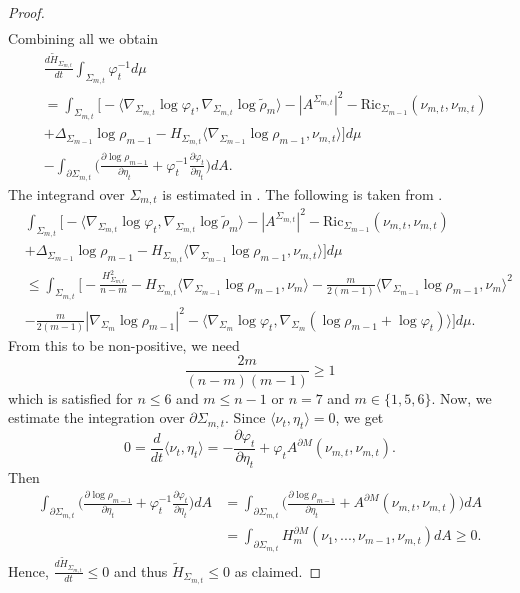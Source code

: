 \documentclass[11pt,letterpaper]{amsart}
\theoremstyle{definition}
\theoremstyle{remark}
\numberwithin{equation}{section}
\begin{document}
\begin{proof}
\[\begin{aligned}
\end{aligned}
\]
Combining all we obtain
\[
\begin{aligned}
    &\frac{d\tilde{H}_{\Sigma_{m,t}}}{dt}\int_{\Sigma_{m,t}}\varphi_{t}^{-1}d\mu\\
   &=\int_{\Sigma_{m,t}}\Big[-\langle \nabla_{\Sigma_{m,t}}\log\varphi_{t},\nabla_{\Sigma_{m,t}}\log\tilde{\rho}_{m}\rangle-|A^{\Sigma_{m,t}}|^2-\text{Ric}_{\Sigma_{m-1}}(\nu_{m,t},\nu_{m,t})
   \\
   &+\Delta_{\Sigma_{m-1}}\log\rho_{m-1}-H_{\Sigma_{m,t}}\langle \nabla_{\Sigma_{m-1}}\log\rho_{m-1},\nu_{m,t}\rangle\Big]d\mu\\
   &-\int_{\partial \Sigma_{m,t}}\Big(\frac{\partial \log\rho_{m-1}}{\partial \eta_{t}}+\varphi_{t}^{-1}\frac{\partial \varphi_{t}}{\partial \eta_{t}}\Big)dA.
\end{aligned}
\]
The integrand over $\Sigma_{m,t}$ is estimated in \cite{XuTrans}. The following is taken from \cite[page 2109 - page 2110]{XuTrans}.
\[
\begin{aligned}
    &\int_{\Sigma_{m,t}}\Big[-\langle \nabla_{\Sigma_{m,t}}\log\varphi_{t},\nabla_{\Sigma_{m,t}}\log\tilde{\rho}_{m}\rangle-|A^{\Sigma_{m,t}}|^2-\text{Ric}_{\Sigma_{m-1}}(\nu_{m,t},\nu_{m,t})
   \\
   &+\Delta_{\Sigma_{m-1}}\log\rho_{m-1}-H_{\Sigma_{m,t}}\langle \nabla_{\Sigma_{m-1}}\log\rho_{m-1},\nu_{m,t}\rangle\Big]d\mu\\
   &\leq \int_{\Sigma_{m,t}}\Big[-\frac{H_{\Sigma_{m,t}}^2}{n-m}-H_{\Sigma_{m,t}}\langle\nabla_{\Sigma_{m-1}}\log\rho_{m-1},\nu_{m}\rangle-\frac{m}{2(m-1)}\langle\nabla_{\Sigma_{m-1}}\log\rho_{m-1},\nu_{m}\rangle^2\\
   &-\frac{m}{2(m-1)}|\nabla_{\Sigma_{m}}\log\rho_{m-1}|^2-\langle\nabla_{\Sigma_{m}}\log\varphi_{t},\nabla_{\Sigma_{m}}(\log\rho_{m-1}+\log\varphi_{t})\rangle\Big]d\mu.
\end{aligned}
\]
From this to be non-positive, we need
\[
\frac{2m}{(n-m)(m-1)}\geq1
\]
which is satisfied for $n\leq 6$ and $m\leq n-1$ or $n=7$ and $m\in \{1,5,6\}$.
Now, we estimate the integration over $\partial \Sigma_{m,t}$. Since $\langle\nu_{t},\eta_{t}\rangle=0$, we get
\[
0=\frac{d}{dt}\langle\nu_{t},\eta_{t}\rangle=-\frac{\partial\varphi_{t}}{\partial \eta_{t}}+\varphi_{t}A^{\partial M}(\nu_{m,t},\nu_{m,t}).
\]
Then
\[
\begin{aligned}
\int_{\partial \Sigma_{m,t}}\Big(\frac{\partial \log\rho_{m-1}}{\partial \eta_{t}}+\varphi_{t}^{-1}\frac{\partial \varphi_{t}}{\partial \eta_{t}}\Big)dA
&=\int_{\partial \Sigma_{m,t}}\Big(\frac{\partial \log\rho_{m-1}}{\partial \eta_{t}}+A^{\partial M}(\nu_{m,t},\nu_{m,t})\Big)dA\\
&=\int_{\partial \Sigma_{m,t}}H_{m}^{\partial M}(\nu_{1},...,\nu_{m-1},\nu_{m,t})dA\geq0. 
\end{aligned}
\]
Hence, $\frac{d\tilde{H}_{\Sigma_{m,t}}}{dt}\leq0$ and thus $\tilde{H}_{\Sigma_{m,t}}\leq 0$ as claimed.
\end{proof}
\end{document}
